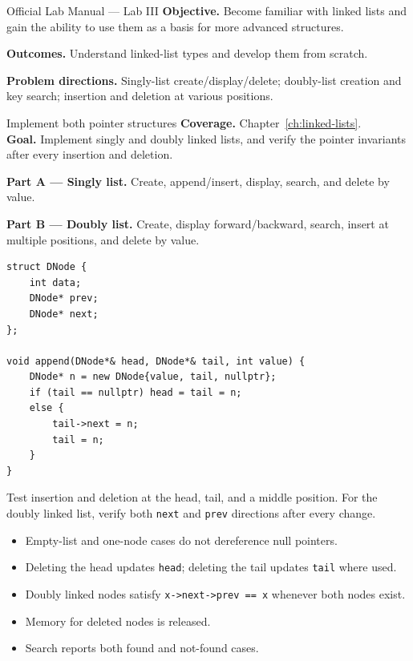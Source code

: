 
\begin{sourcealignment}{Official Lab Manual --- Lab III}
\textbf{Objective.} Become familiar with linked lists and gain the ability to use them as a basis for more advanced structures.

\textbf{Outcomes.} Understand linked-list types and develop them from scratch.

\textbf{Problem directions.} Singly-list create/display/delete; doubly-list creation and key search; insertion and deletion at various positions.
\end{sourcealignment}

\begin{labproject}{Implement both pointer structures}
\textbf{Coverage.} Chapter~\ref{ch:linked-lists}.\\
\textbf{Goal.} Implement singly and doubly linked lists, and verify the pointer invariants after every insertion and deletion.

\textbf{Part A --- Singly list.} Create, append/insert, display, search, and delete by value.

\textbf{Part B --- Doubly list.} Create, display forward/backward, search, insert at multiple positions, and delete by value.

\begin{lstlisting}
struct DNode {
    int data;
    DNode* prev;
    DNode* next;
};

void append(DNode*& head, DNode*& tail, int value) {
    DNode* n = new DNode{value, tail, nullptr};
    if (tail == nullptr) head = tail = n;
    else {
        tail->next = n;
        tail = n;
    }
}
\end{lstlisting}

\begin{tryit}
Test insertion and deletion at the head, tail, and a middle position. For the doubly linked list, verify both \texttt{next} and \texttt{prev} directions after every change.
\end{tryit}
\end{labproject}

\begin{verification}
\begin{itemize}
  \item Empty-list and one-node cases do not dereference null pointers.
  \item Deleting the head updates \texttt{head}; deleting the tail updates \texttt{tail} where used.
  \item Doubly linked nodes satisfy \texttt{x->next->prev == x} whenever both nodes exist.
  \item Memory for deleted nodes is released.
  \item Search reports both found and not-found cases.
\end{itemize}
\end{verification}

